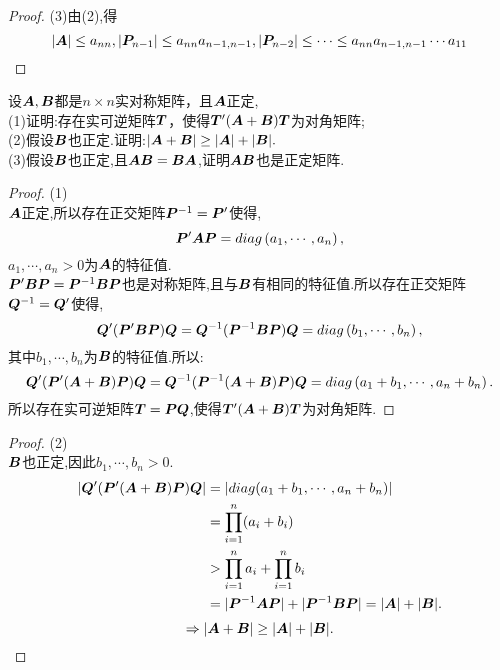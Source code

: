 \documentclass[lang=cn,11pt,normal]{elegantbook}
\begin{document}
	\begin{proof}
		(3)由(2),得
		\begin{equation}
		|\AA|\leq a_{nn},|\PP_{n-1}|\leq a_{nn}a_{n-1,n-1},|\PP_{n-2}|\leq \cdots\leq a_{nn}a_{n-1,n-1}\cdots a_{11}
		\end{equation}
	\end{proof}
	\begin{exercise}
		设$\AA,\BB$都是$n\times n$实对称矩阵，且$\AA$正定,\\
		(1)证明:存在实可逆矩阵$\TT$，使得$\TT'(\AA+\BB)\TT$为对角矩阵;\\
		(2)假设$\BB$也正定.证明:$|\AA+\BB|\geq|\AA|+|\BB|.$\\
		(3)假设$\BB$也正定,且$\AA\BB=\BB\AA$,证明$\AA\BB$也是正定矩阵.
	\end{exercise}
	\begin{proof}
		(1)\\
		$\AA$正定,所以存在正交矩阵$\PP^{-1}=\PP'$使得,
		\begin{equation}
		\PP'\AA\PP=diag\left(a_1,\cdots,a_n\right),
		\end{equation}
		$a_1,\cdots,a_n>0$为$\AA$的特征值.\\
		$\PP'\BB\PP=\PP^{-1}\BB\PP$也是对称矩阵,且与$\BB$有相同的特征值.所以存在正交矩阵$\QQ^{-1}=\QQ'$使得,
		\begin{equation}
		\QQ'(\PP'\BB\PP)\QQ=\QQ^{-1}(\PP^{-1}\BB\PP)\QQ=diag\left(b_1,\cdots,b_n\right),
		\end{equation}
		其中$b_1,\cdots,b_n$为$\BB$的特征值.所以:
		\begin{equation}
		\QQ'(\PP'(\AA+\BB)\PP)\QQ=\QQ^{-1}(\PP^{-1}(\AA+\BB)\PP)\QQ=diag\left(a_1+b_1,\cdots,a_n+b_n\right).
		\end{equation}
		所以存在实可逆矩阵$\TT=\PP\QQ$,使得$\TT'(\AA+\BB)\TT$为对角矩阵.
	\end{proof}
	\begin{proof}
		(2)\\
		$\BB$也正定,因此$b_1,\cdots,b_n>0$.
		\begin{align*}
			|\QQ'(\PP'(\AA+\BB)\PP)\QQ|
			&=|diag(a_1+b_1,\cdots,a_n+b_n)|\\
			&=\prod_{i=1}^{n}(a_i+b_i)\\
			&>\prod_{i=1}^{n}a_i+\prod_{i=1}^{n}b_i\\
			&=|\PP^{-1}\AA\PP|+|\PP^{-1}\BB\PP|=|\AA|+|\BB|.
			\end{align*}
			\begin{equation}
			\Rightarrow|\AA+\BB|\ge|\AA|+|\BB|.
			\end{equation}
	\end{proof}
\end{document}
